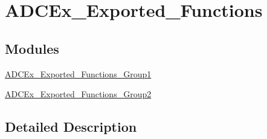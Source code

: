 \hypertarget{group___a_d_c_ex___exported___functions}{\section{A\-D\-C\-Ex\-\_\-\-Exported\-\_\-\-Functions}
\label{group___a_d_c_ex___exported___functions}
}
\subsection*{Modules}
\begin{DoxyCompactItemize}
\item 
\hyperlink{group___a_d_c_ex___exported___functions___group1}{A\-D\-C\-Ex\-\_\-\-Exported\-\_\-\-Functions\-\_\-\-Group1}
\item 
\hyperlink{group___a_d_c_ex___exported___functions___group2}{A\-D\-C\-Ex\-\_\-\-Exported\-\_\-\-Functions\-\_\-\-Group2}
\end{DoxyCompactItemize}


\subsection{Detailed Description}
